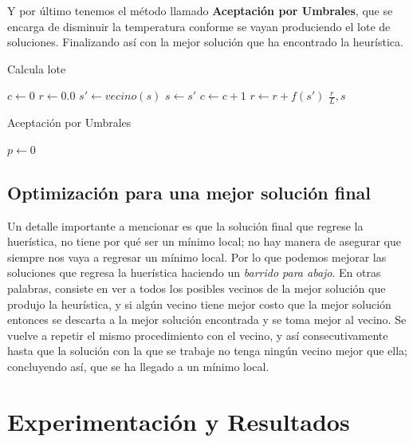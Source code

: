 \documentclass{article}
\newcommand{\tbf}[1]{\textbf{#1}}
\newcommand{\tit}[1]{\textit{#1}}
\begin{document}
  Y por último tenemos el método llamado \tbf{Aceptación por 
  Umbrales}, que se encarga de disminuir la temperatura conforme
  se vayan produciendo el lote de soluciones. Finalizando así
  con la mejor solución que ha encontrado la heurística. \\

  \begin{algorithm}[H]
    \caption{Calcula lote}
    \SetAlgoLined
    $c \leftarrow 0$\;
    $r \leftarrow 0.0$\;
     {
      $s' \leftarrow vecino(s)$\;
       {
        $s \leftarrow s'$\;
        $c \leftarrow c + 1$\;
        $r \leftarrow r + f(s')$\;
      }
    }
    \Return $\frac{r}{L}, s$\;
  \end{algorithm}

  \begin{algorithm}[H]
    \caption{Aceptación por Umbrales}
    \SetAlgoLined
    $p \leftarrow 0$\;
  \end{algorithm}
  
  \subsection{Optimización para una mejor solución final}

  Un detalle importante a mencionar es que la solución final
  que regrese la huerística, no tiene por qué ser un mínimo 
  local; no hay manera de asegurar que siempre nos vaya a 
  regresar un mínimo local. Por lo que podemos mejorar las 
  soluciones que regresa la huerística haciendo un \tit{barrido
  para abajo}. En otras palabras, consiste en ver a todos los 
  posibles vecinos de la mejor solución que produjo la heurística,
  y si algún vecino tiene mejor costo que la mejor solución entonces
  se descarta a la mejor solución encontrada y se toma mejor al vecino.
  Se vuelve a repetir el mismo procedimiento con el vecino, y así 
  consecutivamente hasta que la solución con la que se trabaje no tenga 
  ningún vecino mejor que ella; concluyendo así, que se ha llegado a 
  un mínimo local.

  \section{Experimentación y Resultados} \label{results}
\end{document}
